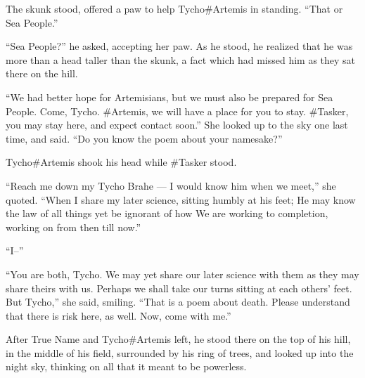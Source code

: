 The skunk stood, offered a paw to help Tycho\#Artemis in standing. ``That or Sea People.''

``Sea People?'' he asked, accepting her paw. As he stood, he realized that he was more than a head taller than the skunk, a fact which had missed him as they sat there on the hill.

``We had better hope for Artemisians, but we must also be prepared for Sea People. Come, Tycho. \#Artemis, we will have a place for you to stay. \#Tasker, you may stay here, and expect contact soon.'' She looked up to the sky one last time, and said. ``Do you know the poem about your namesake?''

Tycho\#Artemis shook his head while \#Tasker stood.

``Reach me down my Tycho Brahe — I would know him when we meet,'' she quoted. ``When I share my later science, sitting humbly at his feet; He may know the law of all things yet be ignorant of how We are working to completion, working on from then till now.''

``I--''

``You are both, Tycho. We may yet share our later science with them as they may share theirs with us. Perhaps we shall take our turns sitting at each others' feet. But Tycho,'' she said, smiling. ``That is a poem about death. Please understand that there is risk here, as well. Now, come with me.''

After True Name and Tycho\#Artemis left, he stood there on the top of his hill, in the middle of his field, surrounded by his ring of trees, and looked up into the night sky, thinking on all that it meant to be powerless.
